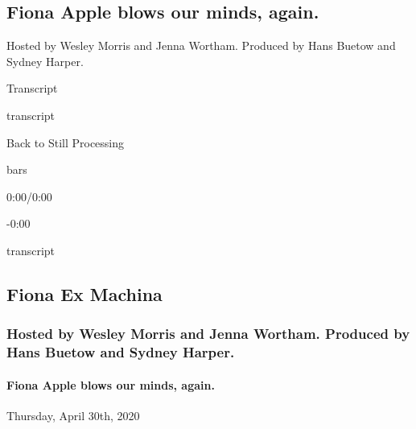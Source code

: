 \hypertarget{fiona-apple-blows-our-minds-again-1}{%
\subsection{Fiona Apple blows our minds,
again.}\label{fiona-apple-blows-our-minds-again-1}}

Hosted by Wesley Morris and Jenna Wortham. Produced by Hans Buetow and
Sydney Harper.

Transcript

transcript

Back to Still Processing

bars

0:00/0:00

-0:00

transcript

\hypertarget{fiona-ex-machina-2}{%
\subsection{Fiona Ex Machina}\label{fiona-ex-machina-2}}

\hypertarget{hosted-by-wesley-morris-and-jenna-wortham-produced-by-hans-buetow-and-sydney-harper-1}{%
\subsubsection{Hosted by Wesley Morris and Jenna Wortham. Produced by
Hans Buetow and Sydney
Harper.}\label{hosted-by-wesley-morris-and-jenna-wortham-produced-by-hans-buetow-and-sydney-harper-1}}

\hypertarget{fiona-apple-blows-our-minds-again-2}{%
\paragraph{Fiona Apple blows our minds,
again.}\label{fiona-apple-blows-our-minds-again-2}}

Thursday, April 30th, 2020

